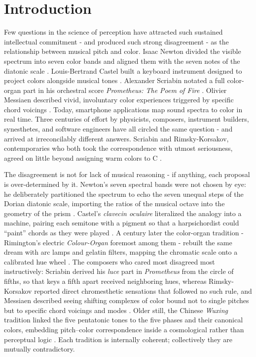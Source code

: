 \documentclass[12pt]{article}
\begin{document}
\newpage

\section{Introduction}

Few questions in the science of perception have attracted such sustained
intellectual commitment - and produced such strong disagreement - 
as the relationship between musical pitch and color. Isaac Newton
divided the visible spectrum into seven color bands and aligned them
with the seven notes of the diatonic scale \citep{newton1704}.
Louis-Bertrand Castel built a keyboard instrument designed to project
colors alongside musical tones \citep{castel1725}. Alexander Scriabin
notated a full color-organ part in his orchestral score \textit{Prometheus:
The Poem of Fire} \citep{scriabin1911}. Olivier Messiaen described
vivid, involuntary color experiences triggered by specific chord
voicings \citep{messiaen1944}. Today, smartphone applications map sound
spectra to color in real time. Three centuries of effort by physicists,
composers, instrument builders, synesthetes, and software engineers
have all circled the same question - and arrived at irreconcilably
different answers. Scriabin and Rimsky-Korsakov, contemporaries who
both took the correspondence with utmost seriousness, agreed on little
beyond assigning warm colors to C \citep{galeyev2007}.

The disagreement is not for lack of musical reasoning - if anything,
each proposal is over-determined by it. Newton's seven spectral bands
were not chosen by eye: he deliberately partitioned the spectrum to
echo the seven unequal steps of the Dorian diatonic scale, importing
the ratios of the musical octave into the geometry of the prism
\citep{newton1704,gage1999}. Castel's \textit{clavecin oculaire}
literalized the analogy into a machine, pairing each semitone with a
pigment so that a harpsichordist could ``paint'' chords as they were
played \citep{castel1725,peacock1988}. A century later the color-organ
tradition - Rimington's electric \textit{Colour-Organ} foremost among
them - rebuilt the same dream with arc lamps and gelatin filters,
mapping the chromatic scale onto a calibrated hue wheel
\citep{rimington1912,peacock1988}. The composers who cared most
disagreed most instructively: Scriabin derived his \textit{luce} part
in \textit{Prometheus} from the circle of fifths, so that keys a fifth
apart received neighboring hues, whereas Rimsky-Korsakov reported
direct chromesthetic sensations that followed no such rule, and
Messiaen described seeing shifting complexes of color bound not to
single pitches but to specific chord voicings and modes
\citep{scriabin1911,messiaen1944,galeyev2007}. Older still, the
Chinese \textit{Wuxing} tradition linked the five pentatonic tones to
the five phases and their canonical colors, embedding pitch--color
correspondence inside a cosmological rather than perceptual logic
\citep{gage1999}. Each tradition is internally coherent; collectively
they are mutually contradictory.
\end{document}
